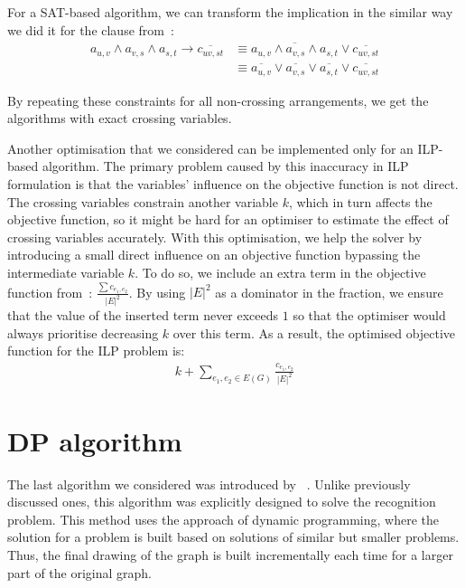 For a SAT-based algorithm, we can transform the implication in the similar way we did it for the clause from~:
\begin{align*}
    a_{u,v} \land a_{v,s} \land a_{s,t} \rightarrow \overline{c_{uv, st}}
    & \equiv \overline{a_{u,v} \land a_{v,s} \land a_{s,t}} \lor \overline{c_{uv, st}} \\
    & \equiv \overline{a_{u,v}} \lor \overline{a_{v,s}} \lor \overline{a_{s,t}} \lor \overline{c_{uv, st}}
\end{align*}

By repeating these constraints for all non-crossing arrangements, we get the algorithms with exact crossing variables.

Another optimisation that we considered can be implemented only for an ILP-based algorithm. The primary problem caused by this inaccuracy in ILP formulation is that the variables' influence on the objective function is not direct. The crossing variables constrain another variable \(k\), which in turn affects the objective function, so it might be hard for an optimiser to estimate the effect of crossing variables accurately. With this optimisation, we help the solver by introducing a small direct influence on an objective function bypassing the intermediate variable \(k\). To do so, we include an extra term in the objective function from~: \(\frac{\sum c_{e_1, e_2}}{|E|^2}\). By using \(|E|^2\) as a dominator in the fraction, we ensure that the value of the inserted term never exceeds \(1\) so that the optimiser would always prioritise decreasing \(k\) over this term. As a result, the optimised objective function for the ILP problem is:
\begin{gather*}
    k + \sum_{e_1, e_2 \in E(G)}\frac{c_{e_1, e_2}}{|E|^2}
\end{gather*}


\section{DP algorithm}\label{sec:DP-def}

The last algorithm we considered was introduced by \citeauthor{okp}~\cite{okp}. Unlike previously discussed ones, this algorithm was explicitly designed to solve the recognition problem. This method uses the approach of dynamic programming, where the solution for a problem is built based on solutions of similar but smaller problems. Thus, the final drawing of the graph is built incrementally each time for a larger part of the original graph.

